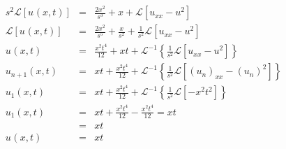 \documentclass[a4paper 11pt]{article}
\newcommand{\Laplace}{\mathcal{L}}
\newcommand{\Un}[2]{u_{#1}(#2)}
\newcommand{\LT}[1]{\Laplace \left[#1\right]}
\newcommand{\Unx}[1]{\Un{#1}{x,t}}
\newcommand{\InverseLx}[1]{\Laplace^{-1}\left\{ #1 \right\}}
\newcommand{\Usub}[1]{u_{#1}}
\newcommand{\Usup}[1]{u^{#1}}
\begin{document}
\begin{eqnarray*}
s^2 \LT{\Un{}{x,t}} &=& \frac{2x^2}{s^3} + x + \LT{\Usub{xx} - \Usup{2}} \\
\LT{\Un{}{x,t}} &=& \frac{2x^2}{s^5} + \frac{x}{s^2} + \frac{1}{s^2}\LT{\Usub{xx} - \Usup{2}} \\
\Un{}{x,t} &=& \frac{x^2t^4}{12} + xt + \InverseLx{\frac{1}{s^2}\LT{\Usub{xx} - \Usup{2}}} \\
\Unx{n+1} &=& xt + \frac{x^2t^4}{12} + \InverseLx{\frac{1}{s^2}\LT{(\Usub{n})_{xx} - (\Usub{n})^2}} \\
\Unx{1} &=& xt + \frac{x^2t^4}{12} + \InverseLx{\frac{1}{s^2}\LT{-x^2t^2}} \\
\Unx{1} &=& xt + \frac{x^2t^4}{12} - \frac{x^2t^4}{12} = xt \\
&=& xt \\
\Un{}{x,t} &=& xt
\end{eqnarray*}
\end{document}
